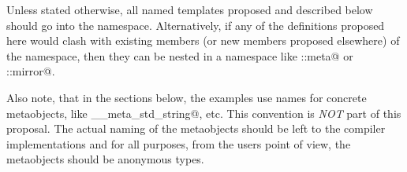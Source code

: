 Unless stated otherwise, all named templates proposed and described below should
go into the \verb@std@ namespace. Alternatively, if any of the definitions
proposed here would clash with existing members (or new members proposed elsewhere)
of the \verb@std@ namespace, then they can be nested in a namespace like
\verb@std::meta@ or \verb@std::mirror@.

Also note, that in the sections below, the examples use names for concrete
metaobjects, like \verb@__meta_std_string@, etc. This convention
is {\em NOT} part of this proposal. The actual naming of the metaobjects
should be left to the compiler implementations and for all purposes,
from the users point of view, the metaobjects should be anonymous types.

















